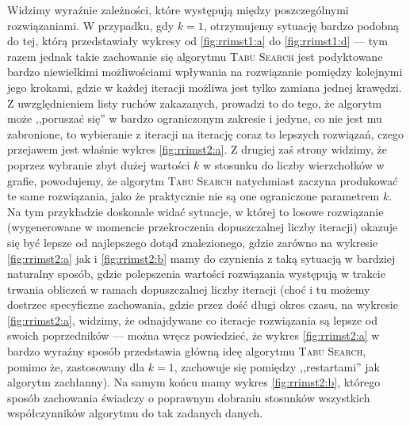 Widzimy wyraźnie zależności, które występują między poszczególnymi rozwiązaniami. W przypadku, gdy $k = 1$, otrzymujemy sytuację bardzo podobną do tej, którą przedstawiały wykresy od \ref{fig:rrimst1:a} do \ref{fig:rrimst1:d} --- tym razem jednak takie zachowanie się algorytmu \textsc{Tabu Search} jest podyktowane bardzo niewielkimi możliwościami wpływania na rozwiązanie pomiędzy kolejnymi jego krokami, gdzie w każdej iteracji możliwa jest tylko zamiana jednej krawędzi. Z uwzględnieniem listy ruchów zakazanych, prowadzi to do tego, że algorytm może ,,poruszać się'' w bardzo ograniczonym zakresie i jedyne, co nie jest mu zabronione, to wybieranie z iteracji na iterację coraz to lepszych rozwiązań, czego przejawem jest właśnie wykres \ref{fig:rrimst2:a}. Z drugiej zaś strony widzimy, że poprzez wybranie zbyt dużej wartości $k$ w stosunku do liczby wierzchołków w grafie, powodujemy, że algorytm \textsc{Tabu Search} natychmiast zaczyna produkować te same rozwiązania, jako że praktycznie nie są one ograniczone parametrem $k$. Na tym przykładzie doskonale widać sytuacje, w której to losowe rozwiązanie (wygenerowane w momencie przekroczenia dopuszczalnej liczby iteracji) okazuje się być lepsze od najlepszego dotąd znalezionego, gdzie zarówno na wykresie \ref{fig:rrimst2:a} jak i \ref{fig:rrimst2:b} mamy do czynienia z taką sytuacją w bardziej naturalny sposób, gdzie polepszenia wartości rozwiązania występują w trakcie trwania obliczeń w ramach dopuszczalnej liczby iteracji (choć i tu możemy dostrzec specyficzne zachowania, gdzie przez dość długi okres czasu, na wykresie \ref{fig:rrimst2:a}, widzimy, że odnajdywane co iteracje rozwiązania są lepsze od swoich poprzedników --- można wręcz powiedzieć, że wykres \ref{fig:rrimst2:a} w bardzo wyraźny sposób przedstawia główną ideę algorytmu \textsc{Tabu Search}, pomimo że, zastosowany dla $k = 1$, zachowuje się pomiędzy ,,restartami'' jak algorytm zachłanny). Na samym końcu mamy wykres \ref{fig:rrimst2:b}, którego sposób zachowania świadczy o poprawnym dobraniu stosunków wszystkich współczynników algorytmu do tak zadanych danych. 

